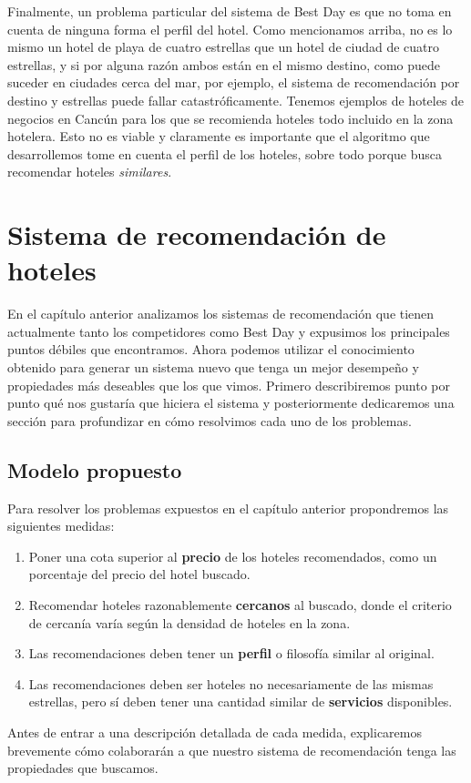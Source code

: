 \documentclass[12pt]{report}
\begin{document}
Finalmente, un problema particular del sistema de Best Day es que no toma en cuenta de ninguna forma el perfil del hotel. Como mencionamos arriba, no es lo mismo un hotel de playa de cuatro estrellas que un hotel de ciudad de cuatro estrellas, y si por alguna razón ambos están en el mismo destino, como puede suceder en ciudades cerca del mar, por ejemplo, el sistema de recomendación por destino y estrellas puede fallar catastróficamente. Tenemos ejemplos de hoteles de negocios en Cancún para los que se recomienda hoteles todo incluido en la zona hotelera. Esto no es viable y claramente es importante que el algoritmo que desarrollemos tome en cuenta el perfil de los hoteles, sobre todo porque busca recomendar hoteles \emph{similares}.

\chapter{Sistema de recomendación de hoteles}

En el capítulo anterior analizamos los sistemas de recomendación que tienen actualmente tanto los competidores como Best Day y expusimos los principales puntos débiles que encontramos. Ahora podemos utilizar el conocimiento obtenido para generar un sistema nuevo que tenga un mejor desempeño y propiedades más deseables que los que vimos. Primero describiremos punto por punto qué nos gustaría que hiciera el sistema y posteriormente dedicaremos una sección para profundizar en cómo resolvimos cada uno de los problemas.

\section{Modelo propuesto}

Para resolver los problemas expuestos en el capítulo anterior propondremos las siguientes medidas:
\begin{enumerate}
	\item Poner una cota superior al \textbf{precio} de los hoteles recomendados, como un porcentaje del precio del hotel buscado.
	\item Recomendar hoteles razonablemente \textbf{cercanos} al buscado, donde el criterio de cercanía varía según la densidad de hoteles en la zona.
	\item Las recomendaciones deben tener un \textbf{perfil} o filosofía similar al original.
	\item Las recomendaciones deben ser hoteles no necesariamente de las mismas estrellas, pero sí deben tener una cantidad similar de \textbf{servicios} disponibles.
\end{enumerate}
Antes de entrar a una descripción detallada de cada medida, explicaremos brevemente cómo colaborarán a que nuestro sistema de recomendación tenga las propiedades que buscamos.
\end{document}
